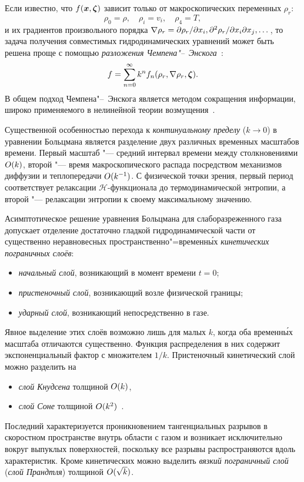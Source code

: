 Если известно, что \(f(\bx,\bzeta)\) зависит только от макроскопических переменных \(\rho_r\):
\begin{equation}\label{eq:Enskog_macro}
    \rho_0 = \rho, \quad \rho_i = v_i, \quad \rho_4 = T,
\end{equation}
и их градиентов произвольного порядка \(\nabla\rho_r = \Pder[\rho_r]{x_i}, \Pderder[\rho_r]{x_i}{x_j},\dots\),
то задача получения совместимых гидродинамических уравнений может быть решена проще с
помощью \emph{разложения Чемпена"--~Энскога}~\cite{Enskog1917, Chapman1960}:
\begin{equation}\label{eq:Enskog_sum}
    f = \sum_{n=0}^\infty k^n f_n(\rho_r,\nabla\rho_r,\bzeta).
\end{equation}
В общем подход Чемпена"--~Энскога является методом сокращения информации,
широко применяемого в нелинейной теории возмущения~\cite{Bogaevski1987, Bogaevski1991}.

Существенной особенностью перехода к \emph{континуальному пределу} (\(k\to0\)) в уравнении Больцмана
является разделение двух различных временных масштабов времени. Первый масштаб "--- средний интервал
времени между столкновениями \(\OO{k}\), второй "--- время макроскопического распада посредством
механизмов диффузии и теплопередачи \(\OO{k^{-1}}\).
С физической точки зрения, первый период соответствует релаксации \(\mathcal{H}\)-функционала
до термодинамической энтропии, а второй "--- релаксации энтропии к своему максимальному значению.

Асимптотическое решение уравнения Больцмана для слаборазреженного газа допускает отделение достаточно гладкой гидродинамической части
от существенно неравновесных пространственно"=временн\'{ы}х \emph{кинетических пограничных слоёв}:
\begin{itemize}
    \item \emph{начальный слой}, возникающий в момент времени \(t=0\);
    \item \emph{пристеночный слой}, возникающий возле физической границы;
    \item \emph{ударный слой}, возникающий непосредственно в газе.
\end{itemize}
Явное выделение этих слоёв возможно лишь для малых \(k\), когда оба временн\'{ы}х масштаба отличаются существенно.
Функция распределения в них содержит экспоненциальный фактор с множителем \(1/k\).
Пристеночный кинетический слой можно разделить на
\begin{itemize}
    \item \emph{слой Кнудсена} толщиной \(\OO{k}\),
    \item \emph{слой Соне} толщиной \(\OO{k^2}\)~\cite{Sone1973}.
\end{itemize}
Последний характеризуется проникновением тангенциальных разрывов в скоростном пространстве внутрь области с газом
и возникает исключительно вокруг выпуклых поверхностей, поскольку все разрывы распространяются вдоль характеристик.
Кроме кинетических можно выделить \emph{вязкий пограничный слой} (\emph{слой Прандтля}) толщиной \(\OO{\sqrt{k}}\).


